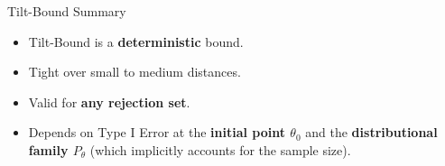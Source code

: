 \begin{frame}{Tilt-Bound Summary}
\begin{itemize}
    \item Tilt-Bound is a \textbf{deterministic} bound.
    \item Tight over small to medium distances.
    \item Valid for \textbf{any rejection set}.
    \item Depends on Type I Error at the 
    \textbf{initial point $\theta_0$} and 
    the \textbf{distributional family $P_\theta$} 
    (which implicitly accounts for the sample size).
\end{itemize}
\end{frame}